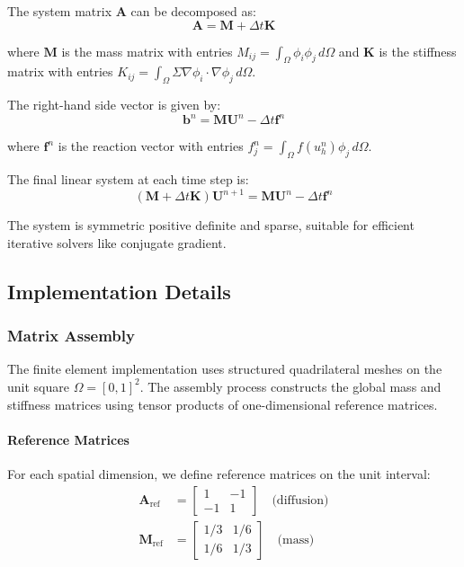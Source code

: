 The system matrix $\mathbf{A}$ can be decomposed as:
\begin{equation}
\mathbf{A} = \mathbf{M} + \Delta t \mathbf{K}
\end{equation}

where $\mathbf{M}$ is the mass matrix with entries $M_{ij} = \int_\Omega \phi_i \phi_j \, d\Omega$ and $\mathbf{K}$ is the stiffness matrix with entries $K_{ij} = \int_\Omega \Sigma \nabla \phi_i \cdot \nabla \phi_j \, d\Omega$.

The right-hand side vector is given by:
\begin{equation}
\mathbf{b}^n = \mathbf{M} \mathbf{U}^n - \Delta t \mathbf{f}^n
\end{equation}

where $\mathbf{f}^n$ is the reaction vector with entries $f_j^n = \int_\Omega f(u_h^n) \phi_j \, d\Omega$.

The final linear system at each time step is:
\begin{equation}
(\mathbf{M} + \Delta t \mathbf{K}) \mathbf{U}^{n+1} = \mathbf{M} \mathbf{U}^n - \Delta t \mathbf{f}^n
\end{equation}

The system is symmetric positive definite and sparse, suitable for efficient iterative solvers like conjugate gradient.

\subsection{Implementation Details}

\subsubsection{Matrix Assembly}

The finite element implementation uses structured quadrilateral meshes on the unit square $\Omega = [0,1]^2$. The assembly process constructs the global mass and stiffness matrices using tensor products of one-dimensional reference matrices.

\paragraph{Reference Matrices}
For each spatial dimension, we define reference matrices on the unit interval:
\begin{align}
\mathbf{A}_{\text{ref}} &= \begin{bmatrix} 1 & -1 \\ -1 & 1 \end{bmatrix} \quad \text{(diffusion)} \\
\mathbf{M}_{\text{ref}} &= \begin{bmatrix} 1/3 & 1/6 \\ 1/6 & 1/3 \end{bmatrix} \quad \text{(mass)}
\end{align}


